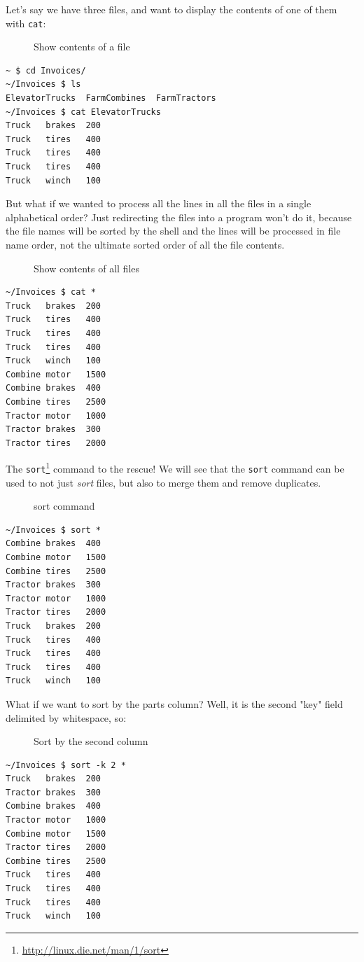 \documentclass[10pt,]{book}
\renewcommand{\href}[2]{#2\footnote{\url{#1}}}
\numberwithin{figure}{chapter}
\DeclareRobustCommand{\drcap}[1]{\begin{figure}[H]\caption{#1}\end{figure}}
\DeclareRobustCommand{\drcmd}[1]{\index{Commands!#1}}
\begin{document}
Let's say we have three files, and want to display the contents of one
of them with \texttt{cat}:

\drcap{Show contents of a file}

\begin{verbatim}
~ $ cd Invoices/
~/Invoices $ ls
ElevatorTrucks  FarmCombines  FarmTractors
~/Invoices $ cat ElevatorTrucks 
Truck   brakes  200
Truck   tires   400
Truck   tires   400
Truck   tires   400
Truck   winch   100
\end{verbatim}

But what if we wanted to process all the lines in all the files in a
single alphabetical order? Just redirecting the files into a program
won't do it, because the file names will be sorted by the shell and the
lines will be processed in file name order, not the ultimate sorted
order of all the file contents.

\drcap{Show contents of all files}

\begin{verbatim}
~/Invoices $ cat *
Truck   brakes  200
Truck   tires   400
Truck   tires   400
Truck   tires   400
Truck   winch   100
Combine motor   1500
Combine brakes  400
Combine tires   2500
Tractor motor   1000
Tractor brakes  300
Tractor tires   2000
\end{verbatim}

The \href{http://linux.die.net/man/1/sort}{\texttt{sort}}\drcmd{sort}
command to the rescue! We will see that the \texttt{sort} command can be
used to not just \emph{sort} files, but also to merge them and remove
duplicates.

\drcap{sort command}

\begin{verbatim}
~/Invoices $ sort *
Combine brakes  400
Combine motor   1500
Combine tires   2500
Tractor brakes  300
Tractor motor   1000
Tractor tires   2000
Truck   brakes  200
Truck   tires   400
Truck   tires   400
Truck   tires   400
Truck   winch   100
\end{verbatim}

What if we want to sort by the parts column? Well, it is the second
"key" field delimited by whitespace, so:

\drcap{Sort by the second column}

\begin{verbatim}
~/Invoices $ sort -k 2 *
Truck   brakes  200
Tractor brakes  300
Combine brakes  400
Tractor motor   1000
Combine motor   1500
Tractor tires   2000
Combine tires   2500
Truck   tires   400
Truck   tires   400
Truck   tires   400
Truck   winch   100
\end{verbatim}
\end{document}
